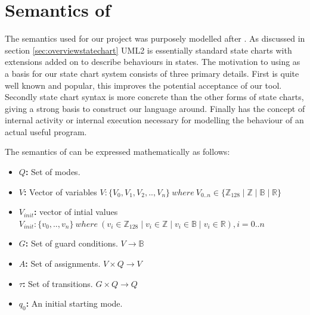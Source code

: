 \section{Semantics of \plcchart}
\label{sec:statechartsem}

The semantics used for our project was purposely modelled after \cite{UML2}. As discussed in section \ref{sec:overviewstatechart} UML2 is essentially standard state charts with extensions added on to describe behaviours in states. The motivation to using \cite{UML2} as a basis for our state chart system consists of three primary details. First \cite{UML2} is quite well known and popular, this improves the potential acceptance of our tool. Secondly \cite{UML2} state chart syntax is more concrete than the other forms of state charts, giving a strong basis to construct our language around. Finally \cite{UML2} has the concept of internal activity or internal execution necessary for modelling the behaviour of an actual useful program.

The semantics of \plcchart can be expressed mathematically as follows:

\begin{definition}
	\plcchart
	
\begin{itemize}
	\item \textbf{$Q$:} Set of modes.
	\item \textbf{$V$:} Vector of variables $V : \lbrace V_0,V_1,V_2,..,V_n \rbrace \: where \: V_{0..n}\in \lbrace \mathbb{Z}_{128} \mid \mathbb{Z} \mid \mathbb{B} \mid \mathbb{R} \rbrace$
	\item \textbf{$V_{init}$:} vector of intial values $V_{init} : \lbrace v_0,..,v_n \rbrace \: where \: (v_i \in \mathbb{Z}_{128} \mid v_i \in \mathbb{Z} \mid v_i \in \mathbb{B} \mid v_i \in \mathbb{R}), i=0..n$ 
	\item \textbf{$G$:} Set of guard conditions. $V \rightarrow \mathbb{B}$
	\item \textbf{$A$:} Set of assignments. $V \times Q \rightarrow V$
	\item \textbf{$\tau$:} Set of transitions. $G \times Q \rightarrow Q$
	\item \textbf{$q_0$:} An initial starting mode.
\end{itemize}
\end{definition}

